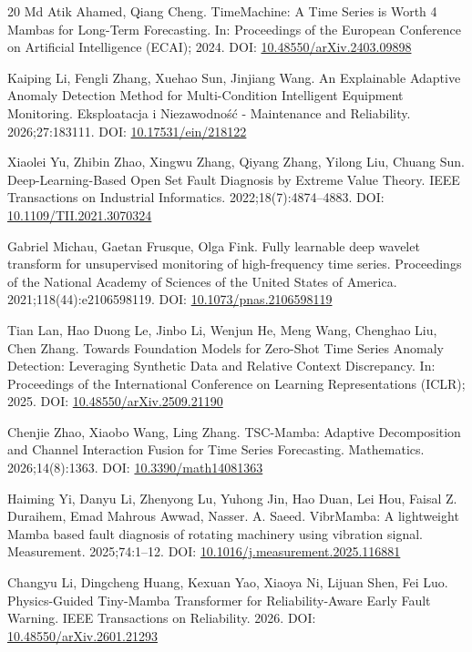 \documentclass[cmes,article,submit,moreauthors,pdftex]{Definitions/tsp}
\begin{document}
\begin{thebibliography}{20}
Md Atik Ahamed, Qiang Cheng. TimeMachine: A Time Series is Worth 4 Mambas for Long-Term Forecasting. In: Proceedings of the European Conference on Artificial Intelligence (ECAI); 2024. DOI: \href{https://doi.org/10.48550/arXiv.2403.09898}{10.48550/arXiv.2403.09898}

Kaiping Li, Fengli Zhang, Xuehao Sun, Jinjiang Wang. An Explainable Adaptive Anomaly Detection Method for Multi-Condition Intelligent Equipment Monitoring. Eksploatacja i Niezawodność - Maintenance and Reliability. 2026;27:183111. DOI: \href{https://doi.org/10.17531/ein/218122}{10.17531/ein/218122}

Xiaolei Yu, Zhibin Zhao, Xingwu Zhang, Qiyang Zhang, Yilong Liu, Chuang Sun. Deep-Learning-Based Open Set Fault Diagnosis by Extreme Value Theory. IEEE Transactions on Industrial Informatics. 2022;18(7):4874--4883. DOI: \href{https://doi.org/10.1109/TII.2021.3070324}{10.1109/TII.2021.3070324}

Gabriel Michau, Gaetan Frusque, Olga Fink. Fully learnable deep wavelet transform for unsupervised monitoring of high-frequency time series. Proceedings of the National Academy of Sciences of the United States of America. 2021;118(44):e2106598119. DOI: \href{https://doi.org/10.1073/pnas.2106598119}{10.1073/pnas.2106598119}

Tian Lan, Hao Duong Le, Jinbo Li, Wenjun He, Meng Wang, Chenghao Liu, Chen Zhang. Towards Foundation Models for Zero-Shot Time Series Anomaly Detection: Leveraging Synthetic Data and Relative Context Discrepancy. In: Proceedings of the International Conference on Learning Representations (ICLR); 2025. DOI: \href{https://doi.org/10.48550/arXiv.2509.21190}{10.48550/arXiv.2509.21190}

Chenjie Zhao, Xiaobo Wang, Ling Zhang. TSC-Mamba: Adaptive Decomposition and Channel Interaction Fusion for Time Series Forecasting. Mathematics. 2026;14(8):1363. DOI: \href{https://doi.org/10.3390/math14081363}{10.3390/math14081363}

Haiming Yi, Danyu Li, Zhenyong Lu, Yuhong Jin, Hao Duan, Lei Hou, Faisal Z. Duraihem, Emad Mahrous Awwad, Nasser. A. Saeed. VibrMamba: A lightweight Mamba based fault diagnosis of rotating machinery using vibration signal. Measurement. 2025;74:1--12. DOI: \href{https://doi.org/10.1016/j.measurement.2025.116881}{10.1016/j.measurement.2025.116881}

Changyu Li, Dingcheng Huang, Kexuan Yao, Xiaoya Ni, Lijuan Shen, Fei Luo. Physics-Guided Tiny-Mamba Transformer for Reliability-Aware Early Fault Warning. IEEE Transactions on Reliability. 2026. DOI: \href{https://doi.org/10.48550/arXiv.2601.21293}{10.48550/arXiv.2601.21293}


\end{thebibliography}
\end{document}
